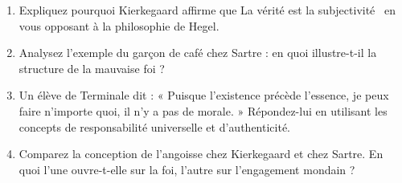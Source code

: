 \documentclass[11pt]{article}
\newcommand{\cle}[1]{{\popxbold\color{popdark}#1}}
\begin{document}
\begin{exercice}
\begin{enumerate}
\item Expliquez pourquoi Kierkegaard affirme que \guillemotleft La vérité est la subjectivité \guillemotright\ en vous opposant à la philosophie de Hegel.
\item Analysez l'exemple du garçon de café chez Sartre : en quoi illustre-t-il la structure de la \cle{mauvaise foi} ?
\item Un élève de Terminale dit : « Puisque l'existence précède l'essence, je peux faire n'importe quoi, il n'y a pas de morale. » Répondez-lui en utilisant les concepts de \cle{responsabilité universelle} et d'\cle{authenticité}.
\item Comparez la conception de l'angoisse chez Kierkegaard et chez Sartre. En quoi l'une ouvre-t-elle sur la foi, l'autre sur l'engagement mondain ?
\end{enumerate}
\end{exercice}
\end{document}
